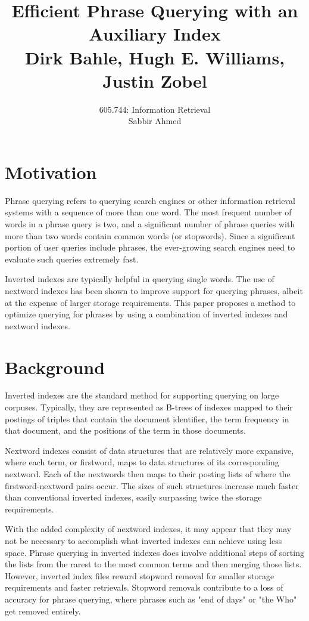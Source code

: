 \documentclass[11pt]{article}
\title{\vspace{-2.5cm} Efficient Phrase Querying with an Auxiliary Index \\ \small{\textbf{Dirk Bahle, Hugh E. Williams, Justin Zobel}}}
\author{\vspace{-1cm} 605.744: Information Retrieval \\ Sabbir Ahmed}
\date{\vspace{-1cm}}
\begin{document}
\maketitle

    \section*{Motivation}

    Phrase querying refers to querying search engines or other information retrieval systems with a sequence of more than one word. The most frequent number of words in a phrase query is two, and a significant number of phrase queries with more than two words contain common words (or stopwords). Since a significant portion of user queries include phrases, the ever-growing search engines need to evaluate such queries extremely fast.

    Inverted indexes are typically helpful in querying single words. The use of nextword indexes has been shown to improve support for querying phrases, albeit at the expense of larger storage requirements. This paper proposes a method to optimize querying for phrases by using a combination of inverted indexes and nextword indexes.

    \section*{Background}

    Inverted indexes are the standard method for supporting querying on large corpuses. Typically, they are represented as B-trees of indexes mapped to their postings of triples that contain the document identifier, the term frequency in that document, and the positions of the term in those documents.

    Nextword indexes consist of data structures that are relatively more expansive, where each term, or firstword, maps to data structures of its corresponding nextword. Each of the nextwords then maps to their posting lists of where the firstword-nextword pairs occur. The sizes of such structures increase much faster than conventional inverted indexes, easily surpassing twice the storage requirements.

    With the added complexity of nextword indexes, it may appear that they may not be necessary to accomplish what inverted indexes can achieve using less space. Phrase querying in inverted indexes does involve additional steps of sorting the lists from the rarest to the most common terms and then merging those lists. However, inverted index files reward stopword removal for smaller storage requirements and faster retrievals. Stopword removals contribute to a loss of accuracy for phrase querying, where phrases such as "end of days" or "the Who" get removed entirely.
\end{document}
